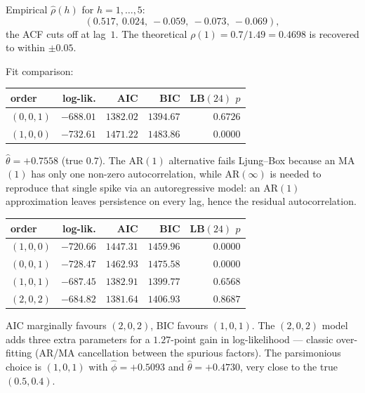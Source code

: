 \documentclass[a4paper,11pt]{article}
\begin{document}
\begin{solution}
Empirical $\widehat\rho(h)$ for $h = 1, \dots, 5$:
\[
  (0.517,\ 0.024,\ -0.059,\ -0.073,\ -0.069),
\]
the ACF cuts off at lag~$1$. The theoretical $\rho(1) = 0.7 /
1.49 = 0.4698$ is recovered to within $\pm 0.05$.

Fit comparison:
\begin{center}
\begin{tabular}{lrrrr}
\toprule
order        & log-lik. & AIC      & BIC      & LB$(24)$ $p$ \\
\midrule
$(0,0,1)$    & $-688.01$ & $\bm{1382.02}$ & $\bm{1394.67}$ & $0.6726$ \\
$(1,0,0)$    & $-732.61$ & $1471.22$ & $1483.86$ & $0.0000$ \\
\bottomrule
\end{tabular}
\end{center}
$\widehat\theta = +0.7558$ (true $0.7$). The AR$(1)$ alternative
fails Ljung--Box because an MA$(1)$ has only one non-zero
autocorrelation, while AR$(\infty)$ is needed to reproduce that
single spike via an autoregressive model: an AR$(1)$ approximation
leaves persistence on every lag, hence the residual autocorrelation.
\end{solution}

\begin{exercise}\end{exercise}

\begin{solution}
\begin{center}
\begin{tabular}{lrrrr}
\toprule
order        & log-lik. & AIC      & BIC      & LB$(24)$ $p$ \\
\midrule
$(1,0,0)$    & $-720.66$ & $1447.31$ & $1459.96$ & $0.0000$ \\
$(0,0,1)$    & $-728.47$ & $1462.93$ & $1475.58$ & $0.0000$ \\
$(1,0,1)$    & $-687.45$ & $1382.91$ & $\bm{1399.77}$ & $0.6568$ \\
$(2,0,2)$    & $-684.82$ & $\bm{1381.64}$ & $1406.93$ & $0.8687$ \\
\bottomrule
\end{tabular}
\end{center}
AIC marginally favours $(2, 0, 2)$, BIC favours $(1, 0, 1)$. The
$(2, 0, 2)$ model adds three extra parameters for a $1.27$-point
gain in log-likelihood --- classic over-fitting (AR/MA cancellation
between the spurious factors). The parsimonious choice is
$(1, 0, 1)$ with $\widehat\phi = +0.5093$ and
$\widehat\theta = +0.4730$, very close to the true $(0.5, 0.4)$.
\end{solution}
\end{document}
